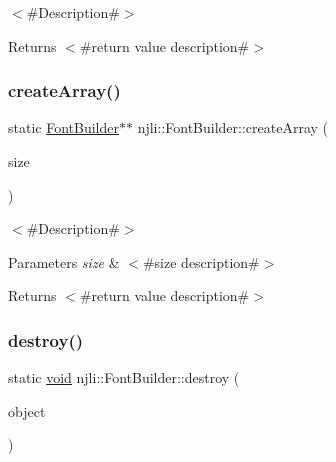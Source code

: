 $<$\#\+Description\#$>$

\begin{DoxyReturn}{Returns}
$<$\#return value description\#$>$ 
\end{DoxyReturn}
\mbox{\label{classnjli_1_1_font_builder_ab142563549b3f4543eef020bae79aaca}} 
\subsubsection{\texorpdfstring{create\+Array()}{createArray()}}
{\footnotesize\ttfamily static \mbox{\hyperlink{classnjli_1_1_font_builder}{Font\+Builder}}$\ast$$\ast$ njli\+::\+Font\+Builder\+::create\+Array (\begin{DoxyParamCaption}\item[{const \mbox{\hyperlink{_util_8h_a10e94b422ef0c20dcdec20d31a1f5049}{u32}}}]{size }\end{DoxyParamCaption})\hspace{0.3cm}{\ttfamily [static]}}

$<$\#\+Description\#$>$


\begin{DoxyParams}{Parameters}
{\em size} & $<$\#size description\#$>$\\
\hline
\end{DoxyParams}
\begin{DoxyReturn}{Returns}
$<$\#return value description\#$>$ 
\end{DoxyReturn}
\mbox{\label{classnjli_1_1_font_builder_ac202726cfed162ff75c162a4eb3b6201}} 
\subsubsection{\texorpdfstring{destroy()}{destroy()}}
{\footnotesize\ttfamily static \mbox{\hyperlink{_thread_8h_af1e856da2e658414cb2456cb6f7ebc66}{void}} njli\+::\+Font\+Builder\+::destroy (\begin{DoxyParamCaption}\item[{\mbox{\hyperlink{classnjli_1_1_font_builder}{Font\+Builder}} $\ast$}]{object }\end{DoxyParamCaption})\hspace{0.3cm}{\ttfamily [static]}}

